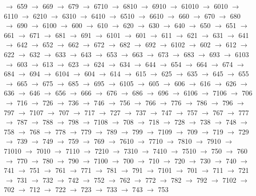 $\rightarrow$ 659 $\rightarrow$ 669 $\rightarrow$ 679 $\rightarrow$ 6710 $\rightarrow$ 6810 $\rightarrow$ 6910 $\rightarrow$ 61010 $\rightarrow$ 6010 $\rightarrow$ 6110 $\rightarrow$ 6210 $\rightarrow$ 6310 $\rightarrow$ 6410 $\rightarrow$ 6510 $\rightarrow$ 6610 $\rightarrow$ 660 $\rightarrow$ 670 $\rightarrow$ 680 $\rightarrow$ 690 $\rightarrow$ 6100 $\rightarrow$ 600 $\rightarrow$ 610 $\rightarrow$ 620 $\rightarrow$ 630 $\rightarrow$ 640 $\rightarrow$ 650 $\rightarrow$ 651 $\rightarrow$ 661 $\rightarrow$ 671 $\rightarrow$ 681 $\rightarrow$ 691 $\rightarrow$ 6101 $\rightarrow$ 601 $\rightarrow$ 611 $\rightarrow$ 621 $\rightarrow$ 631 $\rightarrow$ 641 $\rightarrow$ 642 $\rightarrow$ 652 $\rightarrow$ 662 $\rightarrow$ 672 $\rightarrow$ 682 $\rightarrow$ 692 $\rightarrow$ 6102 $\rightarrow$ 602 $\rightarrow$ 612 $\rightarrow$ 622 $\rightarrow$ 632 $\rightarrow$ 633 $\rightarrow$ 643 $\rightarrow$ 653 $\rightarrow$ 663 $\rightarrow$ 673 $\rightarrow$ 683 $\rightarrow$ 693 $\rightarrow$ 6103 $\rightarrow$ 603 $\rightarrow$ 613 $\rightarrow$ 623 $\rightarrow$ 624 $\rightarrow$ 634 $\rightarrow$ 644 $\rightarrow$ 654 $\rightarrow$ 664 $\rightarrow$ 674 $\rightarrow$ 684 $\rightarrow$ 694 $\rightarrow$ 6104 $\rightarrow$ 604 $\rightarrow$ 614 $\rightarrow$ 615 $\rightarrow$ 625 $\rightarrow$ 635 $\rightarrow$ 645 $\rightarrow$ 655 $\rightarrow$ 665 $\rightarrow$ 675 $\rightarrow$ 685 $\rightarrow$ 695 $\rightarrow$ 6105 $\rightarrow$ 605 $\rightarrow$ 606 $\rightarrow$ 616 $\rightarrow$ 626 $\rightarrow$ 636 $\rightarrow$ 646 $\rightarrow$ 656 $\rightarrow$ 666 $\rightarrow$ 676 $\rightarrow$ 686 $\rightarrow$ 696 $\rightarrow$ 6106 $\rightarrow$ 7106 $\rightarrow$ 706 $\rightarrow$ 716 $\rightarrow$ 726 $\rightarrow$ 736 $\rightarrow$ 746 $\rightarrow$ 756 $\rightarrow$ 766 $\rightarrow$ 776 $\rightarrow$ 786 $\rightarrow$ 796 $\rightarrow$ 797 $\rightarrow$ 7107 $\rightarrow$ 707 $\rightarrow$ 717 $\rightarrow$ 727 $\rightarrow$ 737 $\rightarrow$ 747 $\rightarrow$ 757 $\rightarrow$ 767 $\rightarrow$ 777 $\rightarrow$ 787 $\rightarrow$ 788 $\rightarrow$ 798 $\rightarrow$ 7108 $\rightarrow$ 708 $\rightarrow$ 718 $\rightarrow$ 728 $\rightarrow$ 738 $\rightarrow$ 748 $\rightarrow$ 758 $\rightarrow$ 768 $\rightarrow$ 778 $\rightarrow$ 779 $\rightarrow$ 789 $\rightarrow$ 799 $\rightarrow$ 7109 $\rightarrow$ 709 $\rightarrow$ 719 $\rightarrow$ 729 $\rightarrow$ 739 $\rightarrow$ 749 $\rightarrow$ 759 $\rightarrow$ 769 $\rightarrow$ 7610 $\rightarrow$ 7710 $\rightarrow$ 7810 $\rightarrow$ 7910 $\rightarrow$ 71010 $\rightarrow$ 7010 $\rightarrow$ 7110 $\rightarrow$ 7210 $\rightarrow$ 7310 $\rightarrow$ 7410 $\rightarrow$ 7510 $\rightarrow$ 750 $\rightarrow$ 760 $\rightarrow$ 770 $\rightarrow$ 780 $\rightarrow$ 790 $\rightarrow$ 7100 $\rightarrow$ 700 $\rightarrow$ 710 $\rightarrow$ 720 $\rightarrow$ 730 $\rightarrow$ 740 $\rightarrow$ 741 $\rightarrow$ 751 $\rightarrow$ 761 $\rightarrow$ 771 $\rightarrow$ 781 $\rightarrow$ 791 $\rightarrow$ 7101 $\rightarrow$ 701 $\rightarrow$ 711 $\rightarrow$ 721 $\rightarrow$ 731 $\rightarrow$ 732 $\rightarrow$ 742 $\rightarrow$ 752 $\rightarrow$ 762 $\rightarrow$ 772 $\rightarrow$ 782 $\rightarrow$ 792 $\rightarrow$ 7102 $\rightarrow$ 702 $\rightarrow$ 712 $\rightarrow$ 722 $\rightarrow$ 723 $\rightarrow$ 733 $\rightarrow$ 743 $\rightarrow$ 753 